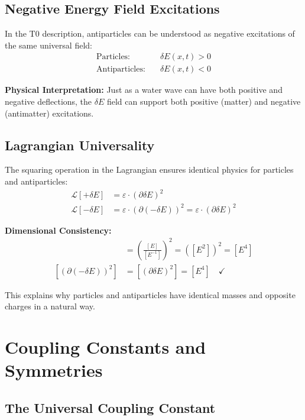 \documentclass[12pt,a4paper]{report}
\begin{document}
	\subsection{Negative Energy Field Excitations}
	
	In the T0 description, antiparticles can be understood as negative excitations of the same universal field:
	\begin{align}
		\text{Particles:} \quad &\delta E(x,t) > 0 \\
		\text{Antiparticles:} \quad &\delta E(x,t) < 0
	\end{align}
	
	\textbf{Physical Interpretation:} Just as a water wave can have both positive and negative deflections, the $\delta E$ field can support both positive (matter) and negative (antimatter) excitations.
	
	\subsection{Lagrangian Universality}
	
	The squaring operation in the Lagrangian ensures identical physics for particles and antiparticles:
	\begin{align}
		\mathcal{L}[+\delta E] &= \varepsilon \cdot (\partial \delta E)^2 \\
		\mathcal{L}[-\delta E] &= \varepsilon \cdot (\partial(-\delta E))^2 = \varepsilon \cdot (\partial \delta E)^2
	\end{align}
	
	\textbf{Dimensional Consistency:}
	\begin{align}
		[(\partial \delta E)^2] &= \left(\frac{[E]}{[E^{-1}]}\right)^2 = ([E^2])^2 = [E^4] \\
		[(\partial(-\delta E))^2] &= [(\partial \delta E)^2] = [E^4] \quad \checkmark
	\end{align}
	
	This explains why particles and antiparticles have identical masses and opposite charges in a natural way.
	
	\section{Coupling Constants and Symmetries}
	
	\subsection{The Universal Coupling Constant}
	
\end{document}
